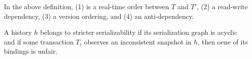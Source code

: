 In the above definition, (1) is a real-time order between $T$ and $T'$, (2) a read-write dependency, (3) a version ordering, and (4) an anti-dependency.

\begin{definition}
  A history $h$ belongs to stricter serializability if its serialization graph is acyclic and if some transaction $T_i$ observes an inconsistent snapshot in $h$, then oene of its bindings is unfair.
\end{definition}

